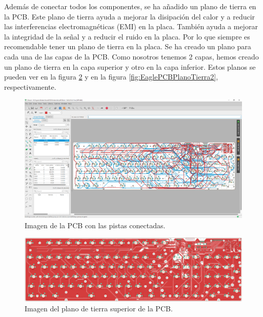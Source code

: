 Además de conectar todos los componentes, se ha añadido un plano de tierra en la \gls{PCB}. Este plano de tierra ayuda a mejorar la disipación del calor y a reducir las interferencias electromagnéticas (EMI) en la placa. También ayuda a mejorar la integridad de la señal y a reducir el ruido en la placa. Por lo que siempre es recomendable tener un plano de tierra en la placa. Se ha creado un plano para cada una de las capas de la \gls{PCB}. Como nosotros tenemos 2 capas, hemos creado un plano de tierra en la capa superior y otro en la capa inferior.
Estos planos se pueden ver en la figura \ref{fig:EaglePCBPlanoTierra1} y en la figura \ref{fig:EaglePCBPlanoTierra2}, respectivamente.

\begin{figure}[H]
    \centering
    \includegraphics[width=1\textwidth]{imagenes/Capitulos/Cap05/EaglePCBConectada.png}
    \caption{Imagen de la \gls{PCB} con las pistas conectadas.}
    \label{fig:EaglePCBConectada}
\end{figure}

\begin{figure}[H]
    \centering
    \includegraphics[width=1\textwidth]{imagenes/Capitulos/Cap05/EaglePCBPlanoTierra1.png}
    \caption{Imagen del plano de tierra superior de la \gls{PCB}.}
    \label{fig:EaglePCBPlanoTierra1}
\end{figure}


